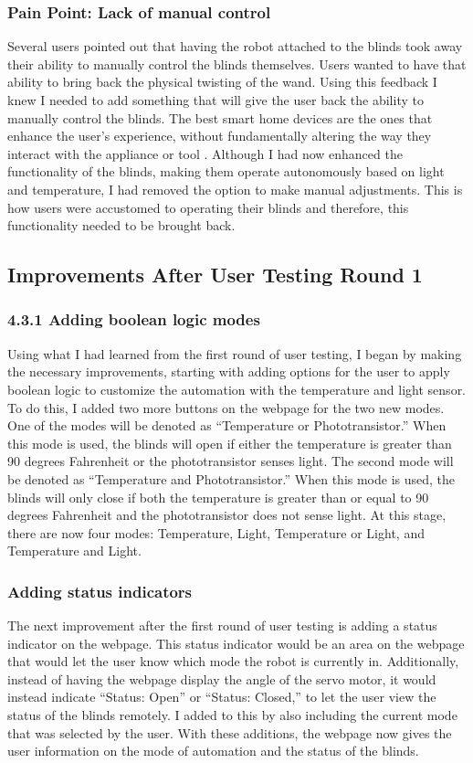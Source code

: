 \documentclass[10pt,twocolumn]{article}
\begin{document}
\subsubsection{Pain Point: Lack of manual control}
Several users pointed out that having the robot attached to the blinds took away their ability to manually control the blinds themselves. Users wanted to have that ability to bring back the physical twisting of the wand. Using this feedback I knew I needed to add something that will give the user back the ability to manually control the blinds. The best smart home devices are the ones that enhance the user’s experience, without fundamentally altering the way they interact with the appliance or tool \cite{Tamayo2022SmartHome}. Although I had now enhanced the functionality of the blinds, making them operate autonomously based on light and temperature, I had removed the option to make manual adjustments. This is how users were accustomed to operating their blinds and therefore, this functionality needed to be brought back.

\subsection{Improvements After User Testing Round 1}
\subsubsection{4.3.1 Adding boolean logic modes}
Using what I had learned from the first round of user testing, I began by making the necessary improvements, starting with adding options for the user to apply boolean logic to customize the automation with the temperature and light sensor. To do this, I added two more buttons on the webpage for the two new modes. One of the modes will be denoted as “Temperature or Phototransistor.” When this mode is used, the blinds will open if either the temperature is greater than 90 degrees Fahrenheit or the phototransistor senses light. The second mode will be denoted as “Temperature and Phototransistor.” When this mode is used, the blinds will only close if both the temperature is greater than or equal to 90 degrees Fahrenheit and the phototransistor does not sense light. At this stage, there are now four modes: Temperature, Light, Temperature or Light, and Temperature and Light.

\subsubsection{Adding status indicators}
The next improvement after the first round of user testing is adding a status indicator on the webpage. This status indicator would be an area on the webpage that would let the user know which mode the robot is currently in. Additionally, instead of having the webpage display the angle of the servo motor, it would instead indicate “Status: Open” or “Status: Closed,” to let the user view the status of the blinds remotely. I added to this by also including the current mode that was selected by the user. With these additions, the webpage now gives the user information on the mode of automation and the status of the blinds.
\end{document}
